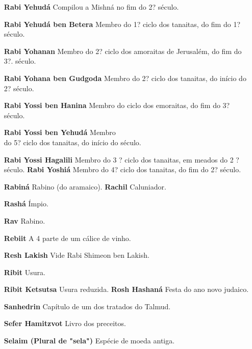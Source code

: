 \begin{itemize}
\item[\textbf{Rabi Yehudá}] Compilou a Mishná no fim do 2? século.

\item[\textbf{Rabi Yehudá ben Betera}] Membro do 1? ciclo dos tanaitas, do
fim do 1? século.

\item[\textbf{Rabi Yohanan}] Membro do 2? ciclo dos amoraitas de Jerusalém,
do fim do 3?. século.

\item[\textbf{Rabi Yohana ben Gudgoda}] Mem­bro do 2? ciclo dos tanaitas, do
início do 2? século.

\item[\textbf{Rabi Yossi ben Hanina}] Membro do
ciclo dos emoraitas, do fim do 3? século.

\item[\textbf{Rabi Yossi ben Yehudá}] Membro\\
do 5? ciclo dos tanaitas, do início do
século.

\item[\textbf{Rabi Yossi Hagalili}] Membro do 3 ? ci­clo dos tanaitas, em
meados do 2 ? século. \textbf{Rabi Yoshiá} Membro do 4? ciclo dos
tanaitas, do fim do 2? século.

\item[\textbf{Rabiná} Rabino (do aramaico). \textbf{Rachil}] Caluniador.

\item[\textbf{Rashá}] Ímpio.

\item[\textbf{Rav}] Rabino.

\item[\textbf{Rebiit}] A 4 parte de um cálice de vinho.

\item[\textbf{Resh Lakish}] Vide Rabi Shimeon ben Lakish.

\item[\textbf{Ribit}] Usura.

\item[\textbf{Ribit Ketsutsa} Usura reduzida. \textbf{Rosh Hashaná}] Festa
do ano novo ju­daico.

\item[\textbf{Sanhedrin}] Capítulo de um dos tra­tados do Talmud.

\item[\textbf{Sefer Hamitzvot}] Livro dos precei­tos.

\item[\textbf{Selaim (Plural de "sela")}] Espécie de moeda antiga.


\end{itemize}
